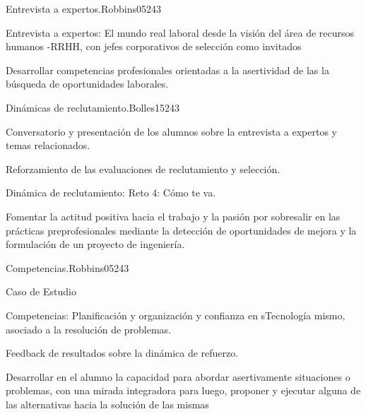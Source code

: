 \begin{syllabus}
\begin{unit}{Entrevista a expertos.}{}{Robbins05}{24}{3}
   \begin{topics}
      \item Entrevista a expertos: El mundo real laboral desde la visión del área de recursos humanos -RRHH, con jefes corporativos de selección como invitados
   \end{topics}

   \begin{learningoutcomes}
      \item Desarrollar competencias profesionales orientadas a la asertividad de las la búsqueda de oportunidades laborales.
   \end{learningoutcomes}
\end{unit}

\begin{unit}{Dinámicas de reclutamiento.}{}{Bolles15}{24}{3}
   \begin{topics}
      \item Conversatorio y presentación de los alumnos sobre la entrevista a expertos y temas relacionados.
      \item Reforzamiento de las evaluaciones de reclutamiento y selección.
      \item Dinámica de reclutamiento: Reto 4: Cómo te va.
      \end{topics}

   \begin{learningoutcomes}
      \item Fomentar la actitud positiva hacia el trabajo y la pasión por sobresalir en las prácticas preprofesionales mediante la detección de oportunidades de mejora y la formulación de un proyecto de ingeniería.
   \end{learningoutcomes}
\end{unit}

\begin{unit}{Competencias.}{}{Robbins05}{24}{3}
   \begin{topics}
      \item Caso de Estudio
      \item Competencias: Planificación y organización y confianza en sTecnología mismo, asociado a la resolución de problemas.
      \item Feedback de resultados sobre la dinámica de refuerzo.
   \end{topics}

   \begin{learningoutcomes}
      \item Desarrollar en el alumno la capacidad para abordar asertivamente situaciones o problemas, con una mirada integradora para luego, proponer y ejecutar alguna de las alternativas hacia la solución de las mismas
   \end{learningoutcomes}
\end{unit}

\begin{coursebibliography}
\end{coursebibliography}

\end{syllabus}

